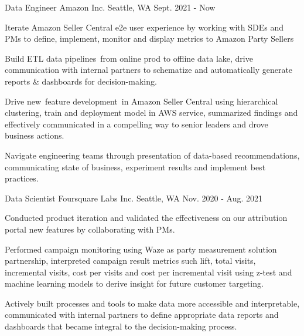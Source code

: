



\begin{cventries}


\cventry
{Data Engineer} %
{Amazon Inc.} %
{Seattle, WA} %
{Sept. 2021 - Now} %
{
\begin{cvitems}
	\item{Iterate Amazon Seller Central e2e user experience by working with SDEs and PMs to define, implement, monitor and display metrics to Amazon  Party Sellers}
	\item{Build ETL data pipelines from online prod to offline data lake, drive communication with internal partners to schematize and automatically generate reports \& dashboards for decision-making.}
	\item{Drive new feature development in Amazon Seller Central using hierarchical clustering, train and deployment model in AWS service, summarized findings and effectively communicated in a compelling way to senior leaders and drove business actions.}
	\item{Navigate engineering teams through presentation of data-based recommendations, communicating state of business, experiment results and implement best practices.}
\end{cvitems}
}


\cventry
{Data Scientist} %
{Foursquare Labs Inc.} %
{Seattle, WA} %
{Nov. 2020 - Aug. 2021} %
{
\begin{cvitems}
	\item{Conducted product iteration and validated the effectiveness on our attribution portal new features by collaborating with PMs.}
	\item{Performed campaign monitoring using Waze as  party measurement solution partnership, interpreted campaign result metrics such lift, total visits, incremental visits, cost per visits and cost per incremental visit using z-test and machine learning models to derive insight for future customer targeting.}
	\item{Actively built processes and tools to make data more accessible and interpretable, communicated with internal partners to define appropriate data reports and dashboards that became integral to the decision-making process.}		
\end{cvitems}
}


\end{cventries}
